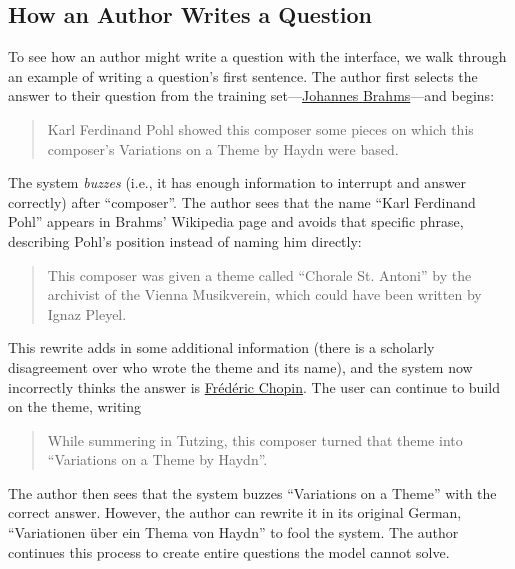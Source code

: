 \subsection{How an Author Writes a Question}

To see how an author might write a question with the interface, we walk
through an example of writing a question's first sentence. The
author first selects the answer to their question from the training
set---\underline{Johannes
Brahms}---and begins:
\begin{quote} Karl Ferdinand Pohl showed this composer some pieces on which
  this composer's Variations on a Theme by Haydn were based. \end{quote}
The  system \emph{buzzes} (i.e., it has enough information to
interrupt and answer correctly) after 
``composer''. The author sees that the name ``Karl
Ferdinand Pohl'' appears in Brahms' Wikipedia page and avoids
 that specific phrase, describing Pohl's
position instead of naming him directly:
\begin{quote} This composer was given a theme called ``Chorale St. Antoni'' by the
  archivist of the Vienna Musikverein, which could have been written
  by Ignaz Pleyel.\end{quote}
This rewrite adds in some additional information (there is a scholarly
disagreement over who wrote the theme and its name), and the  system now incorrectly thinks the answer is
\underline{Fr\'ed\'eric Chopin}.
The user can continue to build on the theme, writing \begin{quote}
   While summering in Tutzing, this composer turned that theme into
   ``Variations on a Theme by Haydn''.  \end{quote}
 The author then sees that the system buzzes ``Variations on a
 Theme'' with the correct answer.  However, the author can rewrite it
 in its original German, ``Variationen \"uber ein Thema von Haydn'' to
 fool the system.
 The author continues this process to
create entire questions the model cannot solve.

